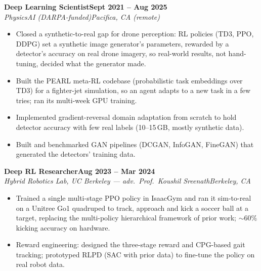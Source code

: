 \documentclass[10pt]{article}
\newcommand{\role}[4]{\textbf{#1}\hfill\textbf{#2}\\\textit{#3}\hfill\textit{#4}}
\begin{document}
\role{Deep Learning Scientist}{Sept 2021 -- Aug 2025}{PhysicsAI (DARPA-funded)}{Pacifica, CA (remote)}
\begin{itemize}
\item Closed a synthetic-to-real gap for drone perception: RL policies (TD3, PPO, DDPG) set a synthetic image generator's parameters, rewarded by a detector's accuracy on real drone imagery, so real-world results, not hand-tuning, decided what the generator made.
\item Built the PEARL meta-RL codebase (probabilistic task embeddings over TD3) for a fighter-jet simulation, so an agent adapts to a new task in a few tries; ran its multi-week GPU training.
\item Implemented gradient-reversal domain adaptation from scratch to hold detector accuracy with few real labels (10--15\,GB, mostly synthetic data).
\item Built and benchmarked GAN pipelines (DCGAN, InfoGAN, FineGAN) that generated the detectors' training data.
\end{itemize}

\role{Deep RL Researcher}{Aug 2023 -- Mar 2024}{Hybrid Robotics Lab, UC Berkeley --- adv.\ Prof.\ Koushil Sreenath}{Berkeley, CA}
\begin{itemize}
\item Trained a single multi-stage PPO policy in IsaacGym and ran it sim-to-real on a Unitree Go1 quadruped to track, approach and kick a soccer ball at a target, replacing the multi-policy hierarchical framework of prior work; $\sim$60\% kicking accuracy on hardware.
\item Reward engineering: designed the three-stage reward and CPG-based gait tracking; prototyped RLPD (SAC with prior data) to fine-tune the policy on real robot data.
\end{itemize}
\end{document}
